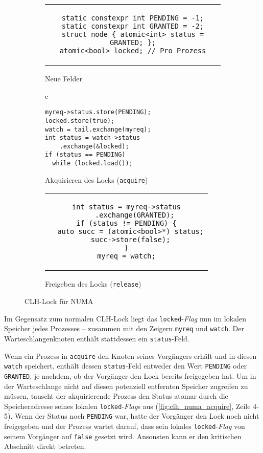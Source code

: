\begin{figure}[h]
    \begin{subfigure}{\textwidth}
        \centering
        \begin{tabular}{c}\begin{lstlisting}
static constexpr int PENDING = -1;
static constexpr int GRANTED = -2;
struct node { atomic<int> status = GRANTED; };
atomic<bool> locked; // Pro Prozess
        \end{lstlisting}\end{tabular}
        \caption{Neue Felder}
        \label{fig:clh_numa_fields}
    \end{subfigure}
    \begin{subfigure}[b]{.5\textwidth}
        \centering
        \begin{tabular}{c}\begin{lstlisting}
myreq->status.store(PENDING);
locked.store(true);
watch = tail.exchange(myreq);
int status = watch->status
    .exchange(&locked);
if (status == PENDING)
  while (locked.load());
        \end{lstlisting}\end{tabular}
        \caption{Akquirieren des Locks (\texttt{acquire})}
        \label{fig:clh_numa_acquire}
    \end{subfigure}
    \begin{subfigure}[b]{.5\textwidth}
        \centering
        \begin{tabular}{c}\begin{lstlisting}
int status = myreq->status
    .exchange(GRANTED);
if (status != PENDING) {
  auto succ = (atomic<bool>*) status;
  succ->store(false);
}
myreq = watch;
        \end{lstlisting}\end{tabular}
        \caption{Freigeben des Locks (\texttt{release})}
        \label{fig:clh_numa_release}
    \end{subfigure}
    \caption{CLH-Lock für NUMA}
    \label{fig:clh_numa_code}
\end{figure}

Im Gegensatz zum normalen CLH-Lock
liegt das \texttt{locked}-\textit{Flag} nun im lokalen Speicher jedes Prozesses
-- zusammen mit den Zeigern \texttt{myreq} und \texttt{watch}.
Der Warteschlangenknoten enthält stattdessen ein \texttt{status}-Feld.

Wenn ein Prozess in \texttt{acquire} den Knoten seines Vorgängers erhält und in diesen \texttt{watch} speichert,
enthält dessen \texttt{status}-Feld entweder den Wert \texttt{PENDING} oder \texttt{GRANTED},
je nachdem,
ob der Vorgänger den Lock bereits freigegeben hat.
Um in der Warteschlange nicht auf diesen potenziell entfernten Speicher zugreifen zu müssen,
tauscht der akquirierende Prozess den Status atomar durch die Speicheradresse seines lokalen \texttt{locked}-\textit{Flag}s aus
(\autoref{fig:clh_numa_acquire}, Zeile 4-5).
Wenn der Status noch \texttt{PENDING} war,
hatte der Vorgänger den Lock noch nicht freigegeben
und der Prozess wartet darauf,
dass sein lokales \texttt{locked}-\textit{Flag}
von seinem Vorgänger auf \texttt{false} gesetzt wird.
Ansonsten kann er den kritischen Abschnitt direkt betreten.

